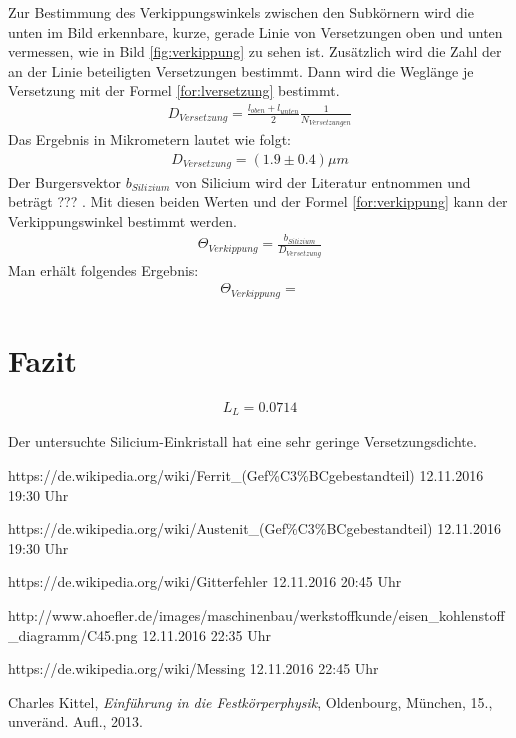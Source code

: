 \documentclass[german, %
parskip=full, %
bibliography=totoc, %
]{scrartcl}
\begin{document}
Zur Bestimmung des Verkippungswinkels zwischen den Subkörnern wird die unten im Bild erkennbare, kurze, gerade Linie von Versetzungen oben und unten vermessen, wie in Bild \ref{fig:verkippung} zu sehen ist. Zusätzlich wird die Zahl der an der Linie beteiligten Versetzungen bestimmt. Dann wird die Weglänge je Versetzung mit der Formel \ref{for:lversetzung} bestimmt.
\begin{align}
D_{Versetzung} = \frac{l_{oben} + l_{unten}}{2} \frac{1}{N_{Versetzungen}} \label{for:lversetzung}
\end{align}
Das Ergebnis in Mikrometern lautet wie folgt:
\begin{align*}
D_{Versetzung} = (1.9 \pm 0.4) \mu m
\end{align*}
Der Burgersvektor $b_{Silizium}$ von Silicium wird der Literatur entnommen und beträgt ??? \cite{kittel}. Mit diesen beiden Werten und der Formel \ref{for:verkippung} kann der Verkippungswinkel bestimmt werden.
\begin{align}
\Theta_{Verkippung} = \frac{b_{Silizium}}{D_{Versetzung}} \label{for:verkippung}
\end{align}
Man erhält folgendes Ergebnis:
\begin{align*}
\Theta_{Verkippung} =
\end{align*}

\section{Fazit}

\begin{align*}
L_L = 0.0714
\end{align*}

Der untersuchte Silicium-Einkristall hat eine sehr geringe Versetzungsdichte.


\begin{thebibliography}{9}

  https://de.wikipedia.org/wiki/Ferrit\_(Gef\%C3\%BCgebestandteil)
	12.11.2016
	19:30 Uhr
	
  https://de.wikipedia.org/wiki/Austenit\_(Gef\%C3\%BCgebestandteil)
	12.11.2016
	19:30 Uhr
	
  https://de.wikipedia.org/wiki/Gitterfehler
	12.11.2016
	20:45 Uhr	
	
  http://www.ahoefler.de/images/maschinenbau/werkstoffkunde/eisen\_kohlenstoff\_diagramm/C45.png
	12.11.2016
	22:35 Uhr	
	
  https://de.wikipedia.org/wiki/Messing
	12.11.2016
	22:45 Uhr	
	
  Charles Kittel,
  \emph{Einführung in die Festkörperphysik},
  Oldenbourg, München,
  15., unveränd. Aufl.,
  2013.

\end{thebibliography}
\end{document}
